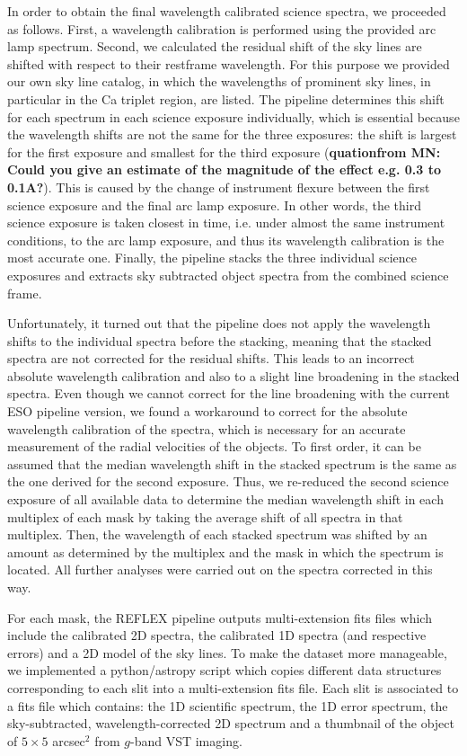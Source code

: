 \documentclass[useAMS,usenatbib]{mn2e}
\begin{document}
In order to obtain the final wavelength calibrated science spectra, we 
proceeded as follows. First, a wavelength calibration 
is performed using the provided arc lamp spectrum. Second, we calculated
the residual shift of the sky lines are shifted with respect to their restframe 
wavelength. For this purpose we provided our own sky line catalog, in which 
the wavelengths of prominent sky lines, in particular in the Ca triplet 
region, are listed. The pipeline determines this shift for each spectrum in 
each science exposure individually, which is essential because the wavelength 
shifts are not the same for the three exposures: the shift is largest for the 
first exposure and smallest for the third exposure ({\bf quationfrom MN: Could you give an estimate of the magnitude of the effect e.g. 0.3 to 0.1A?}). This is caused by the 
change of instrument flexure between the first science exposure and the final 
arc lamp exposure. In other words, the third science exposure is taken 
closest in time, i.e. under almost the same instrument conditions, to the arc 
lamp exposure, and thus its wavelength calibration is the most accurate one. 
Finally, the pipeline stacks the three individual science exposures and 
extracts sky subtracted object spectra from the combined science frame.

Unfortunately, it turned out that the pipeline does not apply the wavelength 
shifts to the individual spectra before the stacking, meaning that the stacked
spectra are not corrected for the residual shifts. This leads to an incorrect
absolute wavelength calibration and also to a slight line broadening in the 
stacked spectra. Even though we cannot correct for the line broadening with
the current ESO pipeline version, we found a workaround to correct for the
absolute wavelength calibration of the spectra, which is necessary for an 
accurate measurement of the radial velocities of the objects. To first order, 
it can be assumed that the median wavelength shift in the stacked spectrum is 
the same as the one derived for the second exposure. Thus, we re-reduced the 
second science exposure of all available data to determine the median 
wavelength shift in each multiplex of each mask by taking the average shift 
of all spectra in that multiplex. Then, the wavelength of each stacked 
spectrum was shifted by an amount as determined by the multiplex and the mask
in which the spectrum is located. All further analyses were carried out 
on the spectra corrected in this way.

For each mask, the REFLEX pipeline outputs multi-extension fits files which include the calibrated 2D spectra, the calibrated 1D spectra (and respective errors) and a 2D model of the sky lines. To make the dataset more manageable, we implemented a python/astropy script which copies different data structures corresponding to each slit into a multi-extension fits file. Each slit is associated to a fits file which contains: the 1D scientific spectrum, the 1D error spectrum, the sky-subtracted, wavelength-corrected 2D spectrum and a thumbnail of the object of $5\times5$ arcsec$^2$ from $g$-band VST imaging. 
\end{document}
